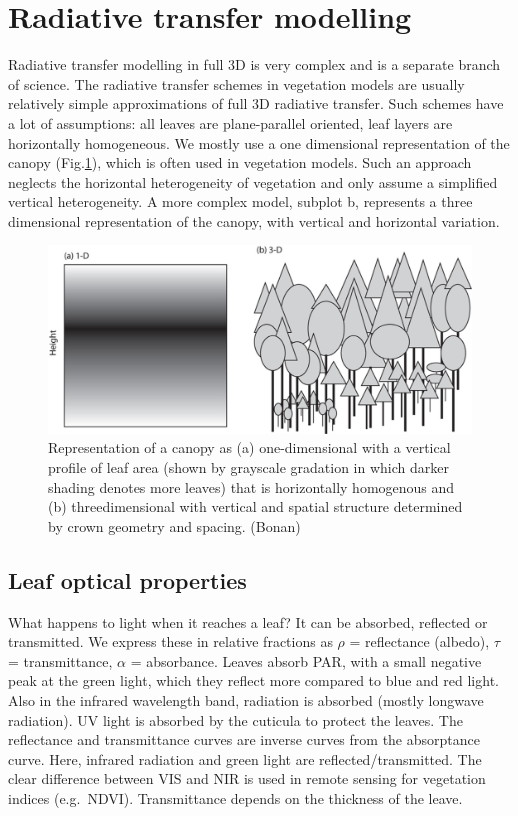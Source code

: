 \documentclass[12pt,oneside]{book}
\begin{document}
\section{Radiative transfer
modelling}\label{radiative-transfer-modelling}

Radiative transfer modelling in full 3D is very complex and is a
separate branch of science. The radiative transfer schemes in vegetation
models are usually relatively simple approximations of full 3D radiative
transfer. Such schemes have a lot of assumptions: all leaves are
plane-parallel oriented, leaf layers are horizontally homogeneous. We
mostly use a one dimensional representation of the canopy
(Fig.\ref{fig:f37}), which is often used in vegetation models. Such an
approach neglects the horizontal heterogeneity of vegetation and only
assume a simplified vertical heterogeneity. A more complex model,
subplot b, represents a three dimensional representation of the canopy,
with vertical and horizontal variation.

\begin{figure}

{\centering \includegraphics[width=0.8\linewidth]{figures/chap3/f37_RT_principle} 

}

\caption{Representation of a canopy as (a) one-dimensional with a vertical profile of leaf area (shown by grayscale gradation in which darker shading denotes more leaves) that is horizontally homogenous and (b) threedimensional with vertical and spatial structure determined by crown geometry and spacing. (Bonan)}\label{fig:f37}
\end{figure}

\subsection{Leaf optical properties}\label{leaf-optical-properties}

What happens to light when it reaches a leaf? It can be absorbed,
reflected or transmitted. We express these in relative fractions as
\(\rho\) = reflectance (albedo), \(\tau\) = transmittance, \(\alpha\) =
absorbance. Leaves absorb PAR, with a small negative peak at the green
light, which they reflect more compared to blue and red light. Also in
the infrared wavelength band, radiation is absorbed (mostly longwave
radiation). UV light is absorbed by the cuticula to protect the leaves.
The reflectance and transmittance curves are inverse curves from the
absorptance curve. Here, infrared radiation and green light are
reflected/transmitted. The clear difference between VIS and NIR is used
in remote sensing for vegetation indices (e.g.~NDVI). Transmittance
depends on the thickness of the leave.
\end{document}
